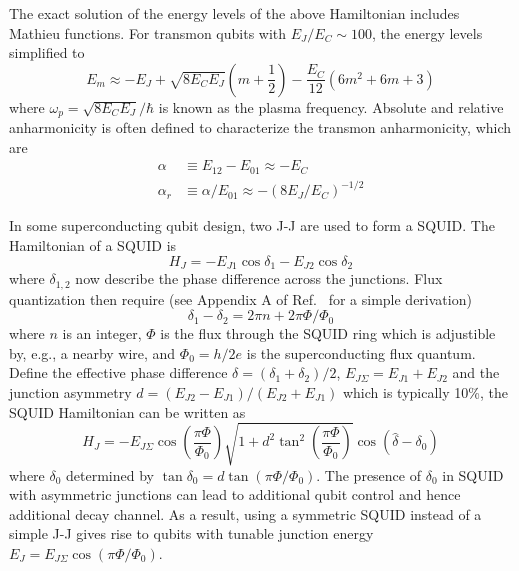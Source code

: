     The exact solution of the energy levels of the above Hamiltonian includes Mathieu functions\cite{schuster2007circuit,koch2007charge}. For transmon qubits with $E_J /E_C \sim 100$, the energy levels simplified to\cite{koch2007charge}
    \begin{equation}
    \label{eqn:transmonLevels}
        E_m \approx -E_J + \sqrt{8E_CE_J} \left (m+\frac{1}{2} \right ) - \frac{E_C}{12}(6m^2+6m+3)
    \end{equation}
    where $ \omega_p = \sqrt{8E_CE_J}/\hbar   $ is known as the plasma frequency. Absolute and relative anharmonicity is often defined to characterize the transmon anharmonicity, which are
    \begin{align}
        \alpha &\equiv E_{12} - E_{01} \approx -E_C\\
        \alpha_r & \equiv \alpha/E_{01} \approx -(8E_J/E_C)^{-1/2}
    \end{align}
    
    In some superconducting qubit design, two J-J are used to form a SQUID. The Hamiltonian of a SQUID is\cite{koch2007charge}
    \begin{equation}
        H_J = -E_{J1}\cos \delta_1 -E_{J2}\cos \delta_2
    \end{equation}
    where $ \delta_{1,2} $ now describe the phase difference across the junctions. Flux quantization then require (see Appendix A of Ref.~ for a simple derivation)
    \begin{equation}
        \delta_1 - \delta_2 = 2 \pi n + 2 \pi \Phi/\Phi_0
    \end{equation}
    where $n$ is an integer, $\Phi $ is the flux through the SQUID ring which is adjustible by, e.g.,  a nearby wire, and $ \Phi_0 =h/2e  $ is the superconducting flux quantum. Define the effective phase difference $ \delta = (\delta_1+\delta_2)/2 $, $E_{J \Sigma} = E_{J1} + E_{J2} $ and the junction asymmetry $d = (E_{J2}- E_{J1})/(E_{J2}+E_{J1}) $ which is typically 10\%, the SQUID Hamiltonian can be written as\cite{koch2007charge}
    \begin{equation}
        H_J = - E_{J \Sigma} \cos \left (\frac{\pi \Phi}{\Phi_0} \right )\sqrt{ 1+d^2 \tan^2 \left (\frac{\pi \Phi}{\Phi_0} \right ) }\cos(\hat \delta - \delta_0)
    \end{equation}
    where $ \delta_0 $ determined by $ \tan \delta_0 = d \tan(\pi \Phi/\Phi_0) $. The presence of $ \delta_0 $ in SQUID with asymmetric junctions can lead to additional qubit control and hence additional decay channel. As a result, using a symmetric SQUID instead of a simple J-J gives rise to qubits with tunable junction energy $ E_J = E_{J \Sigma} \cos(\pi \Phi/\Phi_0) $.

